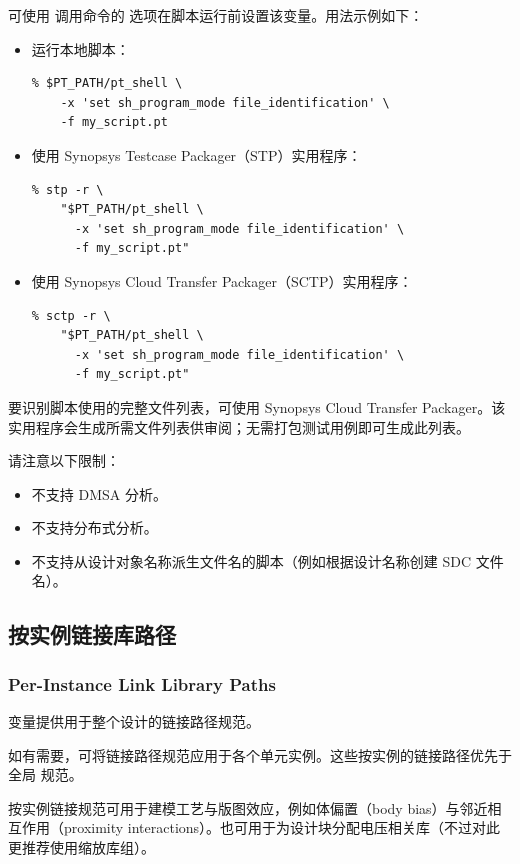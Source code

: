 可使用  调用命令的  选项在脚本运行前设置该变量。用法示例如下：
\begin{itemize}
  \item 运行本地脚本：
\begin{lstlisting}
% $PT_PATH/pt_shell \
    -x 'set sh_program_mode file_identification' \
    -f my_script.pt
\end{lstlisting}
  \item 使用 Synopsys Testcase Packager（STP）实用程序：
\begin{lstlisting}
% stp -r \
    "$PT_PATH/pt_shell \
      -x 'set sh_program_mode file_identification' \
      -f my_script.pt"
\end{lstlisting}
  \item 使用 Synopsys Cloud Transfer Packager（SCTP）实用程序：
\begin{lstlisting}
% sctp -r \
    "$PT_PATH/pt_shell \
      -x 'set sh_program_mode file_identification' \
      -f my_script.pt"
\end{lstlisting}
\end{itemize}

要识别脚本使用的完整文件列表，可使用 Synopsys Cloud Transfer Packager。该实用程序会生成所需文件列表供审阅；无需打包测试用例即可生成此列表。

请注意以下限制：
\begin{itemize}
  \item 不支持 DMSA 分析。
  \item 不支持分布式分析。
  \item 不支持从设计对象名称派生文件名的脚本（例如根据设计名称创建 SDC 文件名）。
\end{itemize}

\subsection{按实例链接库路径}
\subsubsection*{Per-Instance Link Library Paths}

 变量提供用于整个设计的链接路径规范。

如有需要，可将链接路径规范应用于各个单元实例。这些按实例的链接路径优先于全局  规范。

按实例链接规范可用于建模工艺与版图效应，例如体偏置（body bias）与邻近相互作用（proximity interactions）。也可用于为设计块分配电压相关库（不过对此更推荐使用缩放库组）。

